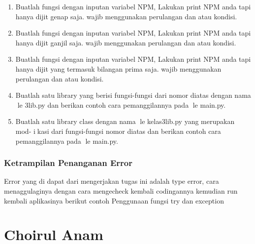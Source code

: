 \begin{enumerate}
    \item Buatlah fungsi dengan inputan variabel NPM, Lakukan print NPM anda tapi
    hanya dijit genap saja. wajib menggunakan perulangan dan atau kondisi.
    

    \item Buatlah fungsi dengan inputan variabel NPM, Lakukan print NPM anda tapi
    hanya dijit ganjil saja. wajib menggunakan perulangan dan atau kondisi.
    

    \item Buatlah fungsi dengan inputan variabel NPM, Lakukan print NPM anda tapi
    hanya dijit yang termasuk bilangan prima saja. wajib menggunakan perulangan
    dan atau kondisi.
    

    \item Buatlah satu library yang berisi fungsi-fungsi dari nomor diatas dengan nama
    le 3lib.py dan berikan contoh cara pemanggilannya pada le main.py.
    

    \item Buatlah satu library class dengan nama le kelas3lib.py yang merupakan mod-
    ikasi dari fungsi-fungsi nomor diatas dan berikan contoh cara pemanggilannya
    pada le main.py.
    

\end{enumerate}
\subsubsection{Ketrampilan Penanganan Error}
Error yang di dapat dari mengerjakan tugas ini adalah type error, cara menaggulaginya dengan cara mengecheck kembali codingannya
kemudian run kembali aplikasinya
berikut contoh Penggunaan fungsi try dan exception



\section{Choirul Anam}
